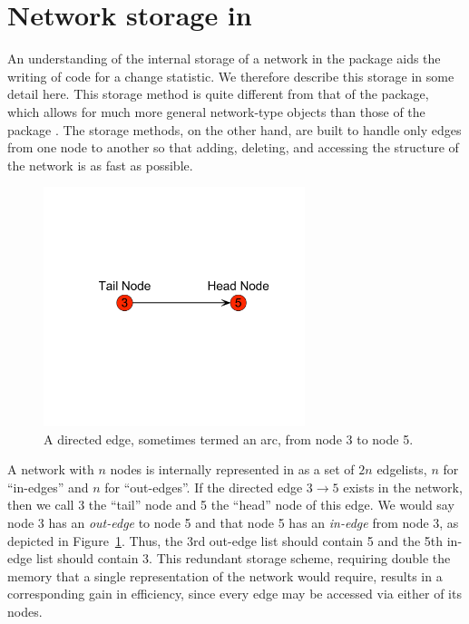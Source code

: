 \documentclass[nojss]{jss}
\begin{document}
\section[Network storage in ergm]{Network storage in }
\label{networkstorage}

An understanding of the internal storage of a network in the  package
aids the writing of code for a change statistic. We therefore
describe this storage in some detail here.
This storage method is quite different from that of the  package,
which allows for much more general network-type objects
than those of the  package \citep{networkjss}.
The  storage methods, on the other hand, are built to
handle only edges from one node to another
so that adding, deleting, and accessing the structure of the network is as
fast as possible.

\begin{figure}[b!]
\centerline{\includegraphics[width=3in]{twonode.pdf}}
\caption{A directed edge, sometimes termed an arc, from
node 3 to node 5.}\label{directededge}
\end{figure}

A network
with $n$ nodes is internally represented in  as a set of $2n$ edgelists,
$n$ for ``in-edges'' and $n$ for ``out-edges''.  If the directed edge
$3\!\!\longrightarrow\!\!5$ exists in the network,
then we call 3 the ``tail'' node and 5 the ``head'' node of this edge.  We would say node 3 
has an {\em out-edge} to node 5 and that node 5 has an {\em in-edge} from node 3, as depicted in
Figure~\ref{directededge}.  Thus, the 3rd out-edge list
should contain 5 and the 5th in-edge list should contain 3.  This redundant storage
scheme, requiring double the memory that a single representation of the network
would require, results in a corresponding gain in efficiency, since every edge
may be accessed via either of its nodes.
\end{document}
